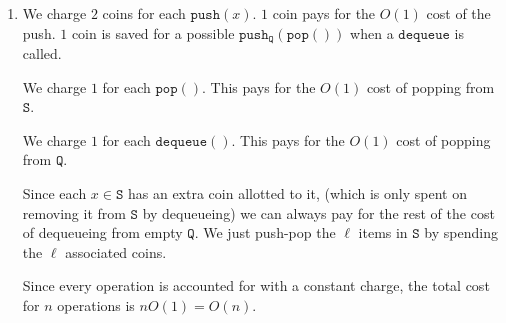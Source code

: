 \documentclass[12 pt, letterpaper]{hmcpset}
\begin{document}
\begin{solution}
\begin{enumerate}
			$\mathtt{pop}()$ removes $1$ element from $\mathtt{S}$. Thus it has a potential difference $-1$ and an amortised cost $1 - 1 = 0 < O(1)$.

			If $\mathtt{Q}$ is not empty, $\mathtt{dequeue}$ does not change $\mathtt{S}$, and thus has a potential difference $0$. Adding to the actual cost gives an amortised cost $1 + 0 = O(1)$.

			If $\mathtt{Q}$ is empty. Then $\mathtt{dequeue}$ removes the $\ell$ elements in $\mathtt{S}$, resulting in a potential difference $\ell$. Adding to the actual cost gives an amortised cost of $\ell + 1 - \ell = O(1)$.

			The sum of all actual costs is less than the sum of all amortised costs which is  $n O(1)$ (since each operation has amortised cost $O(1)$). Thus, the sum of all actual costs is $O(n)$.

		\item We charge $2$ coins for each $\mathtt{push}(x)$.
			$1$ coin pays for the $O(1)$ cost of the push.
			$1$ coin is saved for a possible $\mathtt{push_{Q}}(\mathtt{pop}())$
			when a $\mathtt{dequeue}$ is called.

			We charge $1$ for each $\mathtt{pop}()$.
			This pays for the $O(1)$ cost of popping from $\mathtt{S}$.

			We charge $1$ for each $\mathtt{dequeue}()$.
			This pays for the $O(1)$ cost of popping from $\mathtt{Q}$.

			Since each $x \in \mathtt{S}$ has an extra coin allotted to it,
			(which is only spent on removing it from $\mathtt{S}$ by dequeueing)
			we can always pay for the rest of the cost of dequeueing from empty $\mathtt{Q}$.
			We just push-pop the $\ell$ items in $\mathtt{S}$ by spending the $\ell$ associated coins.

			Since every operation is accounted for with a constant charge, the total cost for $n$ operations is $n O(1) = O(n)$.
	\end{enumerate}
\end{solution}

\pagebreak
\end{document}
